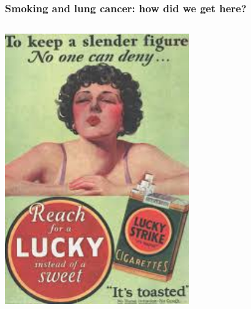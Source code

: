 \documentclass[handout]{beamer}
\begin{document}
\begin{frame}
	\frametitle{Smoking and lung cancer: how did we get here?}
	
	\begin{columns}
		\begin{column}{0.48\textwidth}
			\includegraphics[width=0.9\textwidth]{../figures/cigarette_early1.jpeg}
		\end{column}
		\begin{column}{0.48\textwidth}

\end{column}
\end{columns}
\end{frame}
\end{document}
